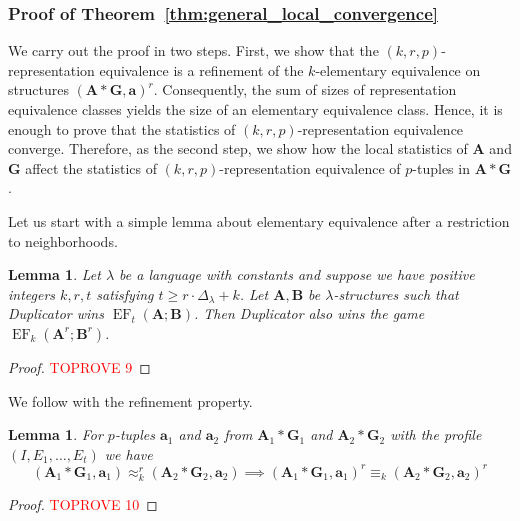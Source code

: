 \documentclass[11pt]{article}
\theoremstyle{plain}
\newtheorem{lemma}[theorem]{Lemma}
\theoremstyle{definition}
\theoremstyle{remark}
\DeclareMathOperator{\EF}{EF}
\newcommand{\str}[1]{\mathbf{#1}}
\newcommand{\maxarity}[1]{\Delta_{#1}}
\newcommand{\tpl}[1]{{\bm{#1}}}
\begin{document}
\subsubsection{Proof of Theorem~\ref{thm:general_local_convergence}}\label{sssec:proof_of_general_local_convergence}

We carry out the proof in two steps.
First, we show that the $(k,r,p)$-representation equivalence is a refinement of the $k$-elementary equivalence on structures $(\str{A} * \str{G}, \tpl{a})^r$.
Consequently, the sum of sizes of representation equivalence classes yields the size of an elementary equivalence class.
Hence, it is enough to prove that the statistics of $(k,r,p)$-representation equivalence converge.
Therefore, as the second step, we show how the local statistics of $\str{A}$ and $\str{G}$ affect the statistics of $(k,r,p)$-representation equivalence of $p$-tuples in $\str{A}*\str{G}$.

Let us start with a simple lemma about elementary equivalence after a restriction to neighborhoods.

\begin{lemma}\label{lem:restriction_to_neighborhoods}
    Let $\lambda$ be a language with constants and suppose we have positive integers $k,r,t$ satisfying $t \geq r \cdot \maxarity{\lambda} + k$.
    Let $\str{A}, \str{B}$ be $\lambda$-structures such that Duplicator wins $\EF_t(\str{A}; \str{B})$.
    Then Duplicator also wins the game $\EF_k(\str{A}^r; \str{B}^r)$.
\end{lemma}
\begin{proof}\textcolor{red}{TOPROVE 9}\end{proof}

We follow with the refinement property.

\begin{lemma}\label{lem:representation_equivalence_refines_elementary_equivalence}
    For $p$-tuples $\tpl{a}_1$ and $\tpl{a}_2$ from $\str{A}_1*\str{G}_1$ and $\str{A}_2*\str{G}_2$ with the profile $(I,E_1, \dots, E_t)$ we have
    \[
        (\str{A}_1*\str{G}_1, \tpl{a}_1) \approx_k^r (\str{A}_2*\str{G}_2, \tpl{a}_2)
        \implies
        (\str{A}_1 * \str{G}_1, \tpl{a}_1)^r \equiv_k (\str{A}_2 * \str{G}_2, \tpl{a}_2)^r
    \]
\end{lemma}
\begin{proof}\textcolor{red}{TOPROVE 10}\end{proof}
\end{document}
